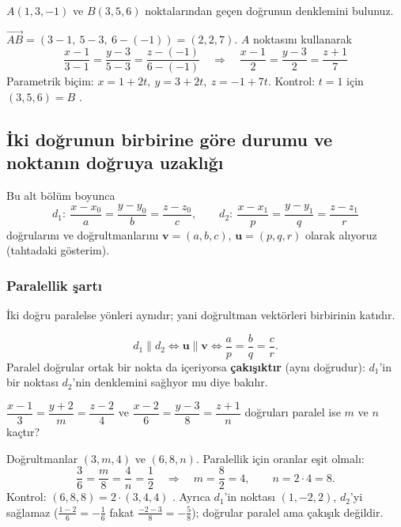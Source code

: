 \begin{soru}
$A(1,3,-1)$ ve $B(3,5,6)$ noktalarından geçen doğrunun denklemini bulunuz.
\end{soru}
\begin{cevap}
$\overrightarrow{AB}=(3-1,\ 5-3,\ 6-(-1))=(2,2,7)$. $A$ noktasını kullanarak
\[ \frac{x-1}{3-1}=\frac{y-3}{5-3}=\frac{z-(-1)}{6-(-1)}\quad\Longrightarrow\quad \boxed{\frac{x-1}{2}=\frac{y-3}{2}=\frac{z+1}{7}} \]
Parametrik biçim: $x=1+2t,\ y=3+2t,\ z=-1+7t$. Kontrol: $t=1$ için $(3,5,6)=B$ \checkmark.
\end{cevap}

\subsection{İki doğrunun birbirine göre durumu ve noktanın doğruya uzaklığı}

Bu alt bölüm boyunca
\[ d_1:\ \frac{x-x_0}{a}=\frac{y-y_0}{b}=\frac{z-z_0}{c},\qquad d_2:\ \frac{x-x_1}{p}=\frac{y-y_1}{q}=\frac{z-z_1}{r} \]
doğrularını ve doğrultmanlarını $\mathbf v=(a,b,c)$, $\mathbf u=(p,q,r)$ olarak alıyoruz (tahtadaki gösterim).

\subsubsection{Paralellik şartı}

İki doğru paralelse yönleri aynıdır; yani doğrultman vektörleri birbirinin katıdır.

\begin{teorem}
\[ d_1\parallel d_2\iff \mathbf u\parallel\mathbf v\iff \frac{a}{p}=\frac{b}{q}=\frac{c}{r}. \]
Paralel doğrular ortak bir nokta da içeriyorsa \textbf{çakışıktır} (aynı doğrudur): $d_1$'in bir noktası $d_2$'nin denklemini sağlıyor mu diye bakılır.
\end{teorem}

\begin{soru}
$\dfrac{x-1}{3}=\dfrac{y+2}{m}=\dfrac{z-2}{4}$ ve $\dfrac{x-2}{6}=\dfrac{y-3}{8}=\dfrac{z+1}{n}$ doğruları paralel ise $m$ ve $n$ kaçtır?
\end{soru}
\begin{cevap}
Doğrultmanlar $(3,m,4)$ ve $(6,8,n)$. Paralellik için oranlar eşit olmalı:
\[ \frac{3}{6}=\frac{m}{8}=\frac{4}{n}=\frac12 \quad\Longrightarrow\quad m=\frac{8}{2}=4,\qquad n=2\cdot4=8 . \]
Kontrol: $(6,8,8)=2\cdot(3,4,4)$ \checkmark. Ayrıca $d_1$'in noktası $(1,-2,2)$, $d_2$'yi sağlamaz ($\frac{1-2}{6}=-\frac16$ fakat $\frac{-2-3}{8}=-\frac58$); doğrular paralel ama çakışık değildir.
\end{cevap}

